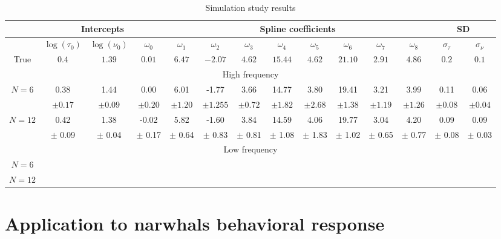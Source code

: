 \documentclass[11pt]{article}
\newcommand {\1}{\mathbb{1}}
\theoremstyle{definition}
\theoremstyle{remark}
\theoremstyle{remark}
\begin{document}
\begin{landscape}

\begin{table}
	\centering
		\begin{tabular}{|c|c|c|c|c|c|c|c|c|c|c|c|c|c|}
		\hline
		&\multicolumn{3}{|c|}{Intercepts} & \multicolumn{8}{|c|}{Spline coefficients} & \multicolumn{2}{|c|}{SD} \\
		\hline
		&$\log(\tau_0)$ & $\log(\nu_0)$ & $\omega_0$ & $\omega_1$ & $\omega_2$ & $\omega_3$ & $\omega_4$  & $\omega_5$ & $\omega_6$ & $\omega_7$ & $\omega_8$ & $\sigma_{\tau}$ & $\sigma_{\nu}$ \\
		\hline 
		 True & $0.4$ & $1.39$ & $0.01$ & $6.47$ & $-2.07$ & $4.62$ & $15.44$ & $4.62$ & $21.10$ & $2.91$ & $4.86$ & $0.2$ & $0.1$ \\
		\hline
			\multicolumn{14}{|c|}{High frequency} \\
			\hline
	\multirow{2}{4em}{$N=6$} & 0.38 & 1.44 & 0.00 & 6.01 &
	-1.77 & 3.66 & 14.77 & 3.80 & 19.41 & 3.21
	 & 3.99 & 0.11 &
	 0.06 \\
	&	$\pm0.17$ & $\pm 0.09$ & $\pm 0.20$ & $\pm 1.20$ &$\pm1.255$ & $\pm0.72$ & $\pm1.82$ & $\pm2.68$ & $\pm 1.38$ & $\pm1.19$ & $\pm1.26$ & $\pm 0.08$ & $\pm0.04$
	 \\
	\hline
	\multirow{2}{4em}{$N=12$} & 0.42 & 1.38 & -0.02
	&5.82&-1.60 & 3.84 & 14.59 &4.06 & 19.77 & 3.04 & 4.20 & 0.09& 
	0.09\\
	& $\pm$ 0.09 & $\pm$ 0.04 & $\pm$ 0.17 & $\pm$ 0.64 & $\pm$ 0.83 & $\pm$ 0.81 & $\pm$ 1.08 & $\pm$ 1.83 & $\pm$ 1.02 & $\pm$ 0.65 & $\pm$ 0.77 &
	$\pm$ 0.08 & $\pm$ 0.03  \\
	\hline	
	\multicolumn{14}{|c|}{Low frequency} \\
	\hline
	\multirow{2}{4em}{$N=6$} & & & & & & & & & & & & &\\
	& & & & & & & & & & & & & \\
	\hline
	\multirow{2}{4em}{$N=12$} &  &  & 
	& &  & & & & & & & & \\
	&  & &  & & & &  & & & & &
	 &  \\
	\hline	
\end{tabular}
\caption{Simulation study results}
\label{table: simulation study results}
\end{table}

\end{landscape}








\section{Application to narwhals behavioral response}
\label{section: application}
\end{document}
